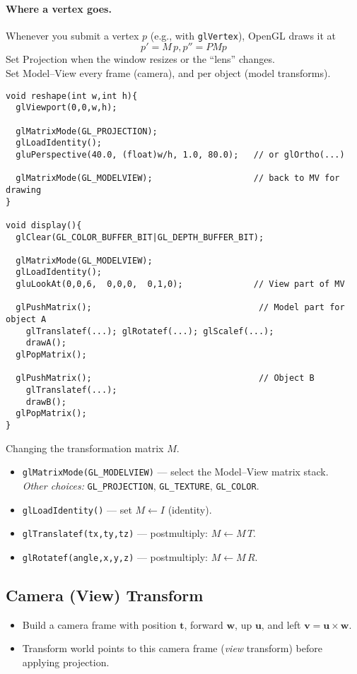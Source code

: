 \documentclass[10pt,twocolumn]{extarticle}
\begin{document}
  \paragraph{Where a vertex goes.}
  Whenever you submit a vertex \(p\) (e.g., with \verb|glVertex|), OpenGL draws it at
  \[
  p' = M\,p, p'' = PMp
  \]
  Set Projection when the window resizes or the “lens” changes.\\
Set Model–View every frame (camera), and per object (model transforms).
  \begin{lstlisting}
void reshape(int w,int h){
  glViewport(0,0,w,h);

  glMatrixMode(GL_PROJECTION);
  glLoadIdentity();
  gluPerspective(40.0, (float)w/h, 1.0, 80.0);   // or glOrtho(...)

  glMatrixMode(GL_MODELVIEW);                    // back to MV for drawing
}

void display(){
  glClear(GL_COLOR_BUFFER_BIT|GL_DEPTH_BUFFER_BIT);

  glMatrixMode(GL_MODELVIEW);
  glLoadIdentity();
  gluLookAt(0,0,6,  0,0,0,  0,1,0);              // View part of MV

  glPushMatrix();                                 // Model part for object A
    glTranslatef(...); glRotatef(...); glScalef(...);
    drawA();
  glPopMatrix();

  glPushMatrix();                                 // Object B
    glTranslatef(...);
    drawB();
  glPopMatrix();
}
\end{lstlisting}
Changing the transformation matrix \(M\).
  \begin{itemize}
    \item \verb|glMatrixMode(GL_MODELVIEW)| — select the Model--View matrix stack.\\
          \emph{Other choices:} \verb|GL_PROJECTION|, \verb|GL_TEXTURE|, \verb|GL_COLOR|.
    \item \verb|glLoadIdentity()| — set \(M \leftarrow I\) (identity).
    \item \verb|glTranslatef(tx,ty,tz)| — postmultiply: \(M \leftarrow M\,T\).
    \item \verb|glRotatef(angle,x,y,z)| — postmultiply: \(M \leftarrow M\,R\).
  \end{itemize}
  
\subsection*{Camera (View) Transform}
\begin{itemize}
  \item Build a camera frame with position \(\mathbf{t}\), forward \(\mathbf{w}\), up \(\mathbf{u}\), and left \(\mathbf{v}=\mathbf{u}\times\mathbf{w}\).
  \item Transform world points to this camera frame (\emph{view} transform) before applying projection.
\end{itemize}
\end{document}
